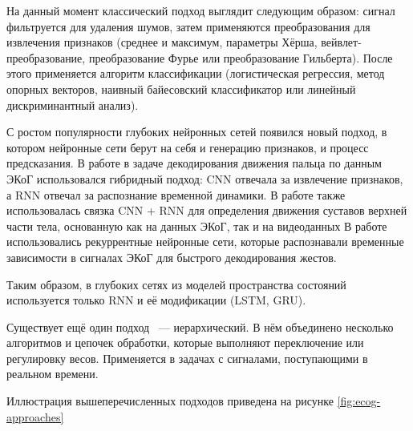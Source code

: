 \documentclass[a4paper, 12pt]{article}
\begin{document}
	На данный момент классический подход выглядит следующим образом: сигнал фильтруется для удаления шумов, затем применяются преобразования для извлечения признаков (среднее и максимум, параметры Хёрша, вейвлет-преобразование, преобразование Фурье или преобразование Гильберта). После этого применяется алгоритм классификации (логистическая регрессия, метод опорных векторов, наивный байесовский классификатор или линейный дискриминантный анализ).
	
	С ростом популярности глубоких нейронных сетей появился новый подход, в котором нейронные сети берут на себя и генерацию признаков, и процесс предсказания.
	В работе \citep{xie2018decoding} в задаче декодирования движения пальца по данным ЭКоГ использовался гибридный подход: CNN отвечала за извлечение признаков, а RNN отвечал за распознание временной динамики.
	В работе \citep{wang2018ajile} также использовалась связка CNN + RNN для определения движения суставов верхней части тела, основанную как на данных ЭКоГ, так и на видеоданных
	В работе \citep{du2018decoding} использовались рекуррентные нейронные сети, которые распознавали временные зависимости в сигналах ЭКоГ для быстрого декодирования жестов.
	
	Таким образом, в глубоких сетях из моделей пространства состояний используется только RNN и её модификации (LSTM, GRU).
	
	Существует ещё один подход ~--- иерархический. В нём объединено несколько алгоритмов и цепочек обработки, которые выполняют переключение или регулировку весов. Применяется в задачах с сигналами, поступающими в реальном времени.
	
	Иллюстрация вышеперечисленных подходов приведена на рисунке \ref{fig:ecog-approaches}
	
\end{document}
